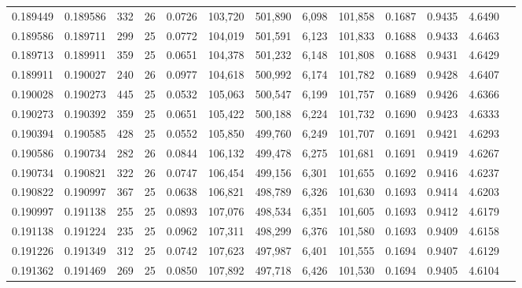 \begin{tabular}{rrrrrrrrrrrrr}
0.189449 & 0.189586 &   332 &  26 &                                     0.0726 & 103,720 & 501,890 &   6,098 & 101,858 & 0.1687 & 0.9435 & 4.6490 \\
0.189586 & 0.189711 &   299 &  25 &                                     0.0772 & 104,019 & 501,591 &   6,123 & 101,833 & 0.1688 & 0.9433 & 4.6463 \\
0.189713 & 0.189911 &   359 &  25 &                                     0.0651 & 104,378 & 501,232 &   6,148 & 101,808 & 0.1688 & 0.9431 & 4.6429 \\
0.189911 & 0.190027 &   240 &  26 &                                     0.0977 & 104,618 & 500,992 &   6,174 & 101,782 & 0.1689 & 0.9428 & 4.6407 \\
0.190028 & 0.190273 &   445 &  25 &                                     0.0532 & 105,063 & 500,547 &   6,199 & 101,757 & 0.1689 & 0.9426 & 4.6366 \\
0.190273 & 0.190392 &   359 &  25 &                                     0.0651 & 105,422 & 500,188 &   6,224 & 101,732 & 0.1690 & 0.9423 & 4.6333 \\
0.190394 & 0.190585 &   428 &  25 &                                     0.0552 & 105,850 & 499,760 &   6,249 & 101,707 & 0.1691 & 0.9421 & 4.6293 \\
0.190586 & 0.190734 &   282 &  26 &                                     0.0844 & 106,132 & 499,478 &   6,275 & 101,681 & 0.1691 & 0.9419 & 4.6267 \\
0.190734 & 0.190821 &   322 &  26 &                                     0.0747 & 106,454 & 499,156 &   6,301 & 101,655 & 0.1692 & 0.9416 & 4.6237 \\
0.190822 & 0.190997 &   367 &  25 &                                     0.0638 & 106,821 & 498,789 &   6,326 & 101,630 & 0.1693 & 0.9414 & 4.6203 \\
0.190997 & 0.191138 &   255 &  25 &                                     0.0893 & 107,076 & 498,534 &   6,351 & 101,605 & 0.1693 & 0.9412 & 4.6179 \\
0.191138 & 0.191224 &   235 &  25 &                                     0.0962 & 107,311 & 498,299 &   6,376 & 101,580 & 0.1693 & 0.9409 & 4.6158 \\
0.191226 & 0.191349 &   312 &  25 &                                     0.0742 & 107,623 & 497,987 &   6,401 & 101,555 & 0.1694 & 0.9407 & 4.6129 \\
0.191362 & 0.191469 &   269 &  25 &                                     0.0850 & 107,892 & 497,718 &   6,426 & 101,530 & 0.1694 & 0.9405 & 4.6104 \\

\end{tabular}
